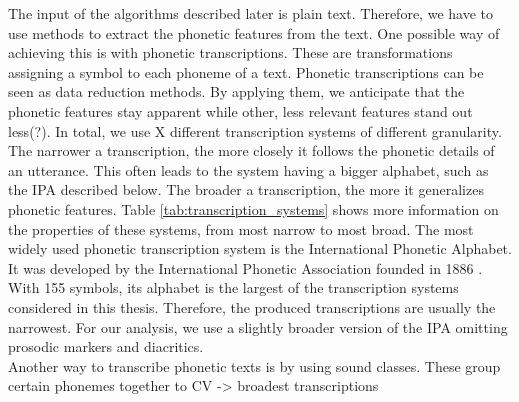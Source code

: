 






The input of the algorithms described later is plain text.
Therefore, we have to use methods to extract the phonetic features from the text.
One possible way of achieving this is with phonetic transcriptions.
These are transformations assigning a symbol to each phoneme of a text.
Phonetic transcriptions can be seen as data reduction methods.
By applying them, we anticipate that the phonetic features stay apparent while other, less relevant features stand out less(?).
In total, we use X different transcription systems of different granularity.
The narrower a transcription, the more closely it follows the phonetic details of an utterance.
This often leads to the system having a bigger alphabet, such as the IPA described below.
The broader a transcription, the more it generalizes phonetic features.
Table \ref{tab:transcription_systems} shows more information on the properties of these systems, from most narrow to most broad.
The most widely used phonetic transcription system is the International Phonetic Alphabet. %
It was developed by the International Phonetic Association founded in 1886 \cite{ipa1999ipaHandbook}.
With 155 symbols, its alphabet is the largest of the transcription systems considered in this thesis.
Therefore, the produced transcriptions are usually the narrowest.
For our analysis, we use a slightly broader version of the IPA omitting prosodic markers and diacritics.\\ %

Another way to transcribe phonetic texts is by using sound classes.
These group certain phonemes together to
CV -> broadest transcriptions





